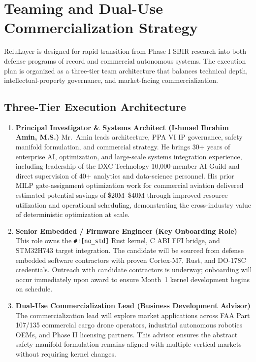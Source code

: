 \documentclass[11pt,oneside]{article}
\begin{document}
\section{Teaming and Dual-Use Commercialization Strategy}

ReluLayer is designed for rapid transition from Phase I SBIR research into both defense programs of record and commercial autonomous systems. The execution plan is organized as a three-tier team architecture that balances technical depth, intellectual-property governance, and market-facing commercialization.

\subsection{Three-Tier Execution Architecture}

\begin{enumerate}[label=\textbf{Tier \arabic*:},leftmargin=2em]

\item \textbf{Principal Investigator \& Systems Architect (Ishmael Ibrahim Amin, M.S.)}
Mr.~Amin leads architecture, PPA VI IP governance, safety manifold formulation, and commercial strategy. He brings 30+ years of enterprise AI, optimization, and large-scale systems integration experience, including leadership of the DXC Technology 10,000-member AI Guild and direct supervision of 40+ analytics and data-science personnel. His prior MILP gate-assignment optimization work for commercial aviation delivered estimated potential savings of \$20M--\$40M through improved resource utilization and operational scheduling, demonstrating the cross-industry value of deterministic optimization at scale.

\item \textbf{Senior Embedded / Firmware Engineer (Key Onboarding Role)}
This role owns the \texttt{\#![no\_std]} Rust kernel, C ABI FFI bridge, and STM32H743 target integration. The candidate will be sourced from defense embedded software contractors with proven Cortex-M7, Rust, and DO-178C credentials. Outreach with candidate contractors is underway; onboarding will occur immediately upon award to ensure Month~1 kernel development begins on schedule.

\item \textbf{Dual-Use Commercialization Lead (Business Development Advisor)}
The commercialization lead will explore market applications across FAA Part 107/135 commercial cargo drone operators, industrial autonomous robotics OEMs, and Phase II licensing partners. This advisor ensures the abstract safety-manifold formulation remains aligned with multiple vertical markets without requiring kernel changes.

\end{enumerate}
\end{document}
